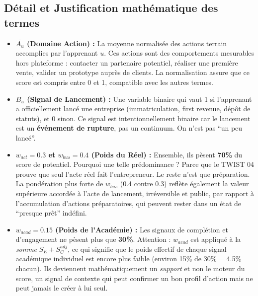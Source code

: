 \documentclass[11pt,a4paper]{article}
\begin{document}
\subsection{Détail et Justification mathématique des termes}
\begin{itemize}
    \item \textbf{$\bar{A_u}$ (Domaine Action) :} La moyenne normalisée des actions terrain accomplies par l'apprenant $u$. Ces actions sont des comportements mesurables hors plateforme : contacter un partenaire potentiel, réaliser une première vente, valider un prototype auprès de clients. La normalisation assure que ce score est compris entre 0 et 1, compatible avec les autres termes.

    \item \textbf{$B_u$ (Signal de Lancement) :} Une variable binaire qui vaut 1 si l'apprenant a officiellement lancé une entreprise (immatriculation, first revenue, dépôt de statuts), et 0 sinon. Ce signal est intentionnellement binaire car le lancement est un \textbf{événement de rupture}, pas un continuum. On n'est pas ``un peu lancé''.

    \item \textbf{$w_{act} = 0.3$ et $w_{bus} = 0.4$ (Poids du Réel) :} Ensemble, ils pèsent \textbf{70\%} du score de potentiel. Pourquoi une telle prédominance ? Parce que le TWIST 04 prouve que seul l'acte réel fait l'entrepreneur. Le reste n'est que préparation. La pondération plus forte de $w_{bus}$ (0.4 contre 0.3) reflète également la valeur supérieure accordée à l'acte de lancement, irréversible et public, par rapport à l'accumulation d'actions préparatoires, qui peuvent rester dans un état de ``presque prêt'' indéfini.

    \item \textbf{$w_{acad} = 0.15$ (Poids de l'Académie) :} Les signaux de complétion et d'engagement ne pèsent plus que \textbf{30\%}. Attention : $w_{acad}$ est appliqué à la \textit{somme} $S_E + S_C^{adj}$, ce qui signifie que le poids effectif de chaque signal académique individuel est encore plus faible (environ 15\% de 30\% = 4.5\% chacun). Ils deviennent mathématiquement un \textit{support} et non le moteur du score, un signal de contexte qui peut confirmer un bon profil d'action mais ne peut jamais le créer à lui seul.
\end{itemize}
\end{document}
